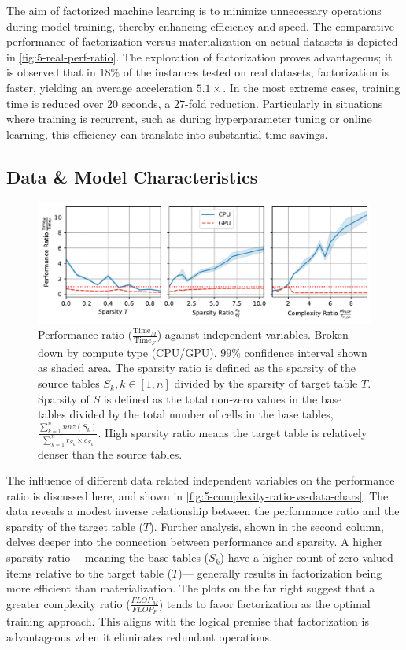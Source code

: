The aim of factorized machine learning is to minimize unnecessary operations during model training, thereby enhancing efficiency and speed. The comparative performance of factorization versus materialization on actual datasets is depicted in \autoref{fig:5-real-perf-ratio}. The exploration of factorization proves advantageous; it is observed that in $18\%$ of the instances tested on real datasets, factorization is faster, yielding an average acceleration $5.1\times$. In the most extreme cases, training time is reduced over $20$ seconds, a $27$-fold reduction. Particularly in situations where training is recurrent, such as during hyperparameter tuning or online learning, this efficiency can translate into substantial time savings.

\subsection{Data \& Model Characteristics}
\begin{figure}[ht]
  \centering
  \includegraphics[width=\linewidth]{chapters/05_cost_estimation/figures/motivation_perf_ratio_vs_data_chars.pdf}
  \caption[Performance ratio for various data characteristics]{Performance ratio ($\frac{\text{Time}_M}{\text{Time}_F}$) against independent variables. Broken down by compute type (CPU/GPU). $99\%$ confidence interval shown as shaded area. The sparsity ratio is defined as the sparsity of the source tables $S_k, k\in[1,n]$ divided by the sparsity of target table $T$. Sparsity of $S$ is defined as the total non-zero values in the base tables divided by the total number of cells in the base tables, $\frac{\sum_{k=1}^{n} nnz(S_k)}{\sum_{k=1}^{n} r_{S_k} \times c_{S_k}}$. High sparsity ratio means the target table is relatively denser than the source tables.}
  \label{fig:5-complexity-ratio-vs-data-chars}
\end{figure}
The influence of different data related independent variables on the performance ratio is discussed here, and shown in \autoref{fig:5-complexity-ratio-vs-data-chars}. The data reveals a modest inverse relationship between the performance ratio and the sparsity of the target table ($T$). Further analysis, shown in the second column, delves deeper into the connection between performance and sparsity. A higher sparsity ratio —meaning the base tables ($S_k$) have a higher count of zero valued items relative to the target table ($T$)— generally results in factorization being more efficient than materialization. The plots on the far right suggest that a greater complexity ratio ($\frac{FLOP_M}{FLOP_F}$) tends to favor factorization as the optimal training approach. This aligns with the logical premise that factorization is advantageous when it eliminates redundant operations.

